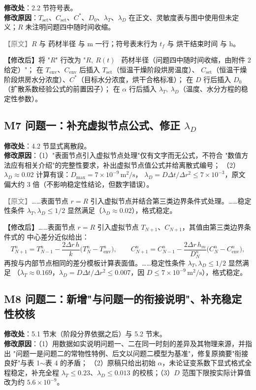 \documentclass[UTF8,zihao=-4]{ctexart}
\newcommand{\yuanduan}[1]{\par\noindent\textcolor{gray}{\small 【原文】}#1\par}
\newcommand{\xinduan}[1]{\par\noindent\textcolor{black}{\small 【修改后】}#1\par}
\begin{document}
\textbf{修改处}：2.2 节符号表。\\
\textbf{修改原因}：$T_{\mathrm{set}}$、$C_{\mathrm{set}}$、$C^{*}$、$D_0$、$\lambda_T$、$\lambda_D$
在正文、灵敏度表与图中使用但未定义；$R$ 未注明问题四中随时间收缩。

\yuanduan{\small $R$ 与 药材半径 与 m 一行；符号表末行为 $t_f$ 与 烘干结束时间 与 h。}
\xinduan{\small 将 "$R$" 行改为 "$R,\ R(t)$ \ 药材半径（问题四中随时间收缩，由附件 2 给定）"；
在 $T_{\mathrm{env}}$、$C_{\mathrm{env}}$ 后插入 $T_{\mathrm{set}}$（恒温干燥阶段烘房温度）、
$C_{\mathrm{set}}$（恒温干燥阶段烘房水分浓度）、$C^{*}$（目标水分浓度，烘干合格标准）；
在 $D$ 行后插入 $D_0$（扩散系数经验公式的前置因子）；
在 $\alpha$ 行后插入 $\lambda_T,\ \lambda_D$（温度、水分方程的稳定性参数）。}

\subsection*{M7 问题一：补充虚拟节点公式、修正 $\lambda_D$}

\textbf{修改处}：4.2 节显式离散段。\\
\textbf{修改原因}：（1）"表面节点引入虚拟节点处理"仅有文字而无公式，不符合
"数值方法应有相关介绍"的完整性要求，补出虚拟节点值公式并给离散式编号；
（2）$\lambda_D\approx0.02$ 计算有误：$D_{\max}=7\times10^{-9}\,\mathrm{m^2/s}$，
$\lambda_D=D\Delta t/\Delta r^2\le7\times10^{-3}$，原文偏大约 3 倍（不影响稳定性结论，但数字错误）。

\yuanduan{……表面节点 $r=R$ 引入虚拟节点并结合第三类边界条件式处理。……稳定性条件
$\lambda_T,\lambda_D\le1/2$ 显然满足（$\lambda_D\approx 0.02$），格式稳定。}
\xinduan{……表面节点 $r=R$ 引入虚拟节点 $T_{N+1}$、$C_{N+1}$，其值由第三类边界条件式的
中心差分近似给出：
\[
T_{N+1}^n = T_{N-1}^n - \frac{2\Delta r\,h}{k}\bigl(T_N^n-T_{\mathrm{env}}^n\bigr),\qquad
C_{N+1}^n = C_{N-1}^n - \frac{2\Delta r\,h_m}{D_N^n}\bigl(C_N^n-C_{\mathrm{env}}^n\bigr),
\]
再按与内部节点相同的差分模板计算表面值。……稳定性条件 $\lambda_T,\lambda_D\le1/2$ 显然满足
（$\lambda_T\approx0.169$，$\lambda_D=D\Delta t/\Delta r^2\le0.007$，因
$D\le7\times10^{-9}\,\mathrm{m^2/s}$），格式稳定。}

\subsection*{M8 问题二：新增"与问题一的衔接说明"、补充稳定性校核}

\textbf{修改处}：5.1 节末（阶段分界依据之后）与 5.2 节末。\\
\textbf{修改原因}：（1）用数据如实说明问题一、二在同一时刻的差异及其物理来源，并指出
"问题一是问题二的常物性特例、后文以问题二模型为基准"，修复原摘要"衔接良好"与表 1$\sim$表 4 的矛盾；
（2）原稿只给出初始 $\alpha$，未论证变系数下显式格式全程稳定，补充全程
$\lambda_T\le0.23$、$\lambda_D\le0.013$ 的校核；（3）$D$ 范围下限按实际计算值改为约 $5.6\times10^{-9}$。
\end{document}
